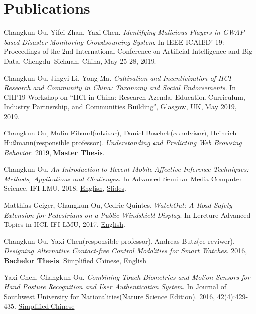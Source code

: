 \section{\textbf{Publications}}
 \resumeSubHeadingListStart
    \item{
        Changkun Ou, Yifei Zhan, Yaxi Chen.
        \emph{Identifying Malicious Players in GWAP-based Disaster Monitoring Crowdsourcing System}. 
        In IEEE ICAIBD' 19: Proceedings of the 2nd International Conference on Artificial Intelligence and Big Data. Chengdu, Sichuan, China, May 25-28, 2019.
    }
    \item{
        Changkun Ou, Jingyi Li, Yong Ma.
        \emph{Cultivation and Incentivization of HCI Research and Community in China: Taxonomy and Social Endorsements}. 
        In CHI'19 Workshop on ``HCI in China: Research Agenda, Education Curriculum, Industry Partnership, and Communities Building'', Glasgow, UK, May 2019, 2019.
    }
    \item{
        Changkun Ou, Malin Eiband(advisor), Daniel Buschek(co-advisor), Heinrich Hußmann(responsible professor).
        \emph{Understanding and Predicting Web Browsing Behavior}. 
        2019, \textbf{Master Thesis}.
    }
    \item{
        Changkun Ou.
        \emph{An Introduction to Recent Mobile Affective Inference Techniques: Methods, Applications and Challenges}.
        In Advanced Seminar Media Computer Science, IFI LMU, 2018. \href{https://github.com/changkun/hs-ws17-mobile-emotion-inference/blob/master/src/lmumihs-ou.pdf}{English}, \href{https://github.com/changkun/hs-ws17-mobile-emotion-inference/blob/master/slides/presentation-final.pdf}{Slides}.
    }
    \item{
        Matthias Geiger, Changkun Ou, Cedric Quintes.
        \emph{WatchOut: A Road Safety Extension for Pedestrians on a Public Windshield Display}.
        In Lercture Advanced Topics in HCI, IFI LMU, 2017. \href{https://github.com/changkun/ath-windshild-display/blob/master/paper/ath.pdf}{English}.
    }
    \item{
        Changkun Ou, Yaxi Chen(responsible professor), Andreas Butz(co-reviwer).
        \emph{Designing Alternative Contact-free Control Modalities for Smart Watches}. 
        2016, \textbf{Bachelor Thesis}. \href{https://changkun.us/files/cv/bachelor-thesis-cn.html}{Simplified Chinese}, 
        \href{https://changkun.us/files/cv/bachelor-thesis-en.html}{English}
    }
    \item{
        Yaxi Chen, Changkun Ou. 
        \emph{Combining Touch Biometrics and Motion Sensors for Hand Posture Recognition and User Authentication System}. 
        In Journal of Southwest University for Nationalities(Nature Science Edition). 
        2016, 42(4):429-435. \href{https://changkun.us/files/cv/touch.swun.html}{Simplified Chinese}
    }
